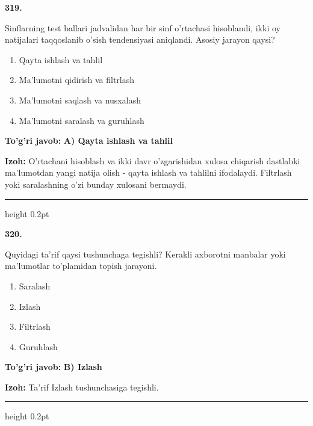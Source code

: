 \documentclass[10pt,a4paper,oneside]{article}
\begin{document}
\noindent\textbf{\color{ink}319.}
\par
Sinflarning test ballari jadvalidan har bir sinf o'rtachasi hisoblandi, ikki oy natijalari taqqoslanib o'sish tendensiyasi aniqlandi. Asosiy jarayon qaysi?
\begin{enumerate}[label=\Alph*),leftmargin=9mm]
\item Qayta ishlash va tahlil
\item Ma'lumotni qidirish va filtrlash
\item Ma'lumotni saqlash va nusxalash
\item Ma'lumotni saralash va guruhlash
\end{enumerate}
\begin{tcolorbox}[enhanced,breakable,colback=teal!4,colframe=teal!50!black,boxrule=0.5pt,arc=1.1mm,left=3mm,right=3mm,top=1.7mm,bottom=1.7mm,before skip=2mm,after skip=2mm]
\textbf{\color{teal}To'g'ri javob:} \textbf{A) Qayta ishlash va tahlil}
\par\smallskip
\textbf{Izoh:} O'rtachani hisoblash va ikki davr o'zgarishidan xulosa chiqarish dastlabki ma'lumotdan yangi natija olish - qayta ishlash va tahlilni ifodalaydi. Filtrlash yoki saralashning o'zi bunday xulosani bermaydi.
\end{tcolorbox}
\vspace{2mm}\hrule height 0.2pt \vspace{3mm}

\noindent\textbf{\color{ink}320.}
\par
Quyidagi ta'rif qaysi tushunchaga tegishli? Kerakli axborotni manbalar yoki ma'lumotlar to'plamidan topish jarayoni.
\begin{enumerate}[label=\Alph*),leftmargin=9mm]
\item Saralash
\item Izlash
\item Filtrlash
\item Guruhlash
\end{enumerate}
\begin{tcolorbox}[enhanced,breakable,colback=teal!4,colframe=teal!50!black,boxrule=0.5pt,arc=1.1mm,left=3mm,right=3mm,top=1.7mm,bottom=1.7mm,before skip=2mm,after skip=2mm]
\textbf{\color{teal}To'g'ri javob:} \textbf{B) Izlash}
\par\smallskip
\textbf{Izoh:} Ta'rif Izlash tushunchasiga tegishli.
\end{tcolorbox}
\vspace{2mm}\hrule height 0.2pt \vspace{3mm}
\end{document}
